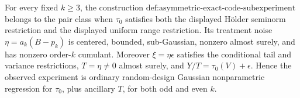 For every fixed \(k\ge3\), the construction \(\text{def:asymmetric-exact-code-subexperiment}\) belongs to the pair class when \(\tau_0\) satisfies both the displayed H\"older seminorm restriction and the displayed uniform range restriction. Its treatment noise \(\eta=a_k(B-p_k)\) is centered, bounded, sub-Gaussian, nonzero almost surely, and has nonzero order-\(k\) cumulant. Moreover \(\xi=\eta\epsilon\) satisfies the conditional tail and variance restrictions, \(T=\eta\ne0\) almost surely, and \(Y/T=\tau_0(V)+\epsilon\). Hence the observed experiment is ordinary random-design Gaussian nonparametric regression for \(\tau_0\), plus ancillary \(T\), for both odd and even \(k\).